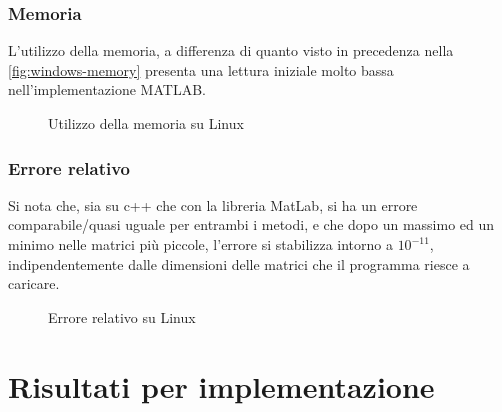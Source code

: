 \documentclass[11pt,italian]{article}
\begin{document}
\subsubsection*{Memoria}
L'utilizzo della memoria, a differenza di quanto visto in precedenza nella \cref{fig:windows-memory} presenta una lettura iniziale molto bassa nell'implementazione MATLAB.
\begin{figure}[H]
    \caption{Utilizzo della memoria su Linux}
    \label{fig:linux-memory}
\end{figure}

\smallskip
\subsubsection*{Errore relativo}
Si nota che, sia su c++ che con la libreria MatLab, si ha un errore comparabile/quasi uguale per entrambi i metodi, e che dopo un massimo ed un minimo nelle matrici più piccole, l'errore si stabilizza intorno a $10^{-11}$, indipendentemente dalle dimensioni delle matrici che il programma riesce a caricare.
\begin{figure}[H]
    \caption{Errore relativo su Linux}
    \label{fig:linux-error}
\end{figure}

\newpage
\section{Risultati per implementazione}
\label{section-results-os}
\end{document}
